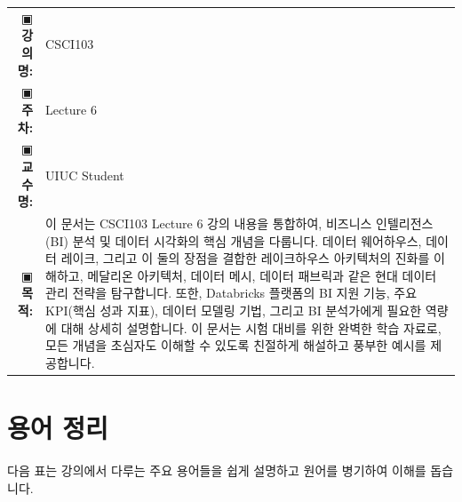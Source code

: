 \documentclass[11pt,a4paper]{article}
\makeatletter
\theoremstyle{definition}
\newcommand{\metainfo}[4]{
\begin{tcolorbox}[
    colback=lightpurple,
    colframe=darkpurple,
    boxrule=1pt,
    arc=2mm,
    left=10pt,
    right=10pt,
    top=8pt,
    bottom=8pt
]
\begin{tabular}{@{}rl@{}}
▣ \textbf{강의명:} & #1 \\[0.3em]
▣ \textbf{주차:} & #2 \\[0.3em]
▣ \textbf{교수명:} & #3 \\[0.3em]
▣ \textbf{목적:} & \begin{minipage}[t]{0.75\textwidth}#4\end{minipage}
\end{tabular}
\end{tcolorbox}
}
\makeatother
\begin{document}
\thispagestyle{firstpage}

\metainfo{CSCI103}{Lecture 6}{UIUC Student}{이 문서는 CSCI103 Lecture 6 강의 내용을 통합하여, 비즈니스 인텔리전스(BI) 분석 및 데이터 시각화의 핵심 개념을 다룹니다. 데이터 웨어하우스, 데이터 레이크, 그리고 이 둘의 장점을 결합한 레이크하우스 아키텍처의 진화를 이해하고, 메달리온 아키텍처, 데이터 메시, 데이터 패브릭과 같은 현대 데이터 관리 전략을 탐구합니다. 또한, Databricks 플랫폼의 BI 지원 기능, 주요 KPI(핵심 성과 지표), 데이터 모델링 기법, 그리고 BI 분석가에게 필요한 역량에 대해 상세히 설명합니다. 이 문서는 시험 대비를 위한 완벽한 학습 자료로, 모든 개념을 초심자도 이해할 수 있도록 친절하게 해설하고 풍부한 예시를 제공합니다.}

\tableofcontents

\newpage

\section{용어 정리}

다음 표는 강의에서 다루는 주요 용어들을 쉽게 설명하고 원어를 병기하여 이해를 돕습니다.
\end{document}
